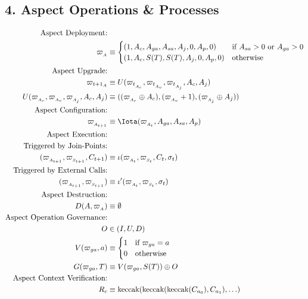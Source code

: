 \subsection*{4. Aspect Operations \& Processes}
\begin{align*}
\text{Aspect Deployment:} & \\
\varpi_{_A} & \equiv
\begin{cases}
(1, A_c, A_{ga}, A_{sa}, A_j, 0, A_p, 0) & \text{if } A_{sa} > 0 \text{ or } A_{ga} > 0 \\
(1, A_c, S(T), S(T), A_j, 0, A_p, 0) & \text{otherwise}
\end{cases} \\
\text{Aspect Upgrade:} & \\
\varpi_{{t+1}_A} & \equiv U(\varpi_{t_{_{A_c}}}, \varpi_{t_{_{A_v}}}, \varpi_{t_{_{A_j}}}, A_c, A_j) \\
U(\varpi_{_{A_c}}, \varpi_{_{A_v}}, \varpi_{_{A_j}}, A_c, A_j) & \equiv ((\varpi_{_{A_c}} \oplus A_c), (\varpi_{_{A_v}} + 1), (\varpi_{_{A_j}} \oplus A_j)) \\
\text{Aspect Configuration:} & \\
\varpi_{_{A_{t+1}}} & \equiv \Iota(\varpi_{_{A_t}}, A_{ga}, A_{sa}, A_p) \\
\text{Aspect Execution:} & \\
\text{Triggered by Join-Points:} & \\
(\varpi_{_{A_{t+1}}}, \varpi_{_{S_{t+1}}}, C_{t+1}) & \equiv \iota(\varpi_{_{A_{t}}}, \varpi_{_{S_{t}}}, C_{t}, \sigma_t) \\
\text{Triggered by External Calls:} & \\
(\varpi_{_{A_{t+1}}}, \varpi_{_{S_{t+1}}}) & \equiv \iota'(\varpi_{_{A_{t}}}, \varpi_{_{S_{t}}}, \sigma_{t}) \\
\text{Aspect Destruction:} & \\
D(A, \varpi_{_A}) & \equiv \emptyset \\
\text{Aspect Operation Governance:} & \\
O & \in (I, U, D) \\
V(\varpi_{ga}, a) & \equiv
\begin{cases}
1 & \text{if } \varpi_{ga} = a \\
0 & \text{otherwise}
\end{cases} \\
G(\varpi_{ga}, T) & \equiv V(\varpi_{ga}, S(T)) \oplus O \\
\text{Aspect Context Verification:} & \\
R_c & \equiv \text{keccak}(\text{keccak}(\text{keccak}(C_{a_0}), C_{a_1}), \ldots) \\

\end{align*}
